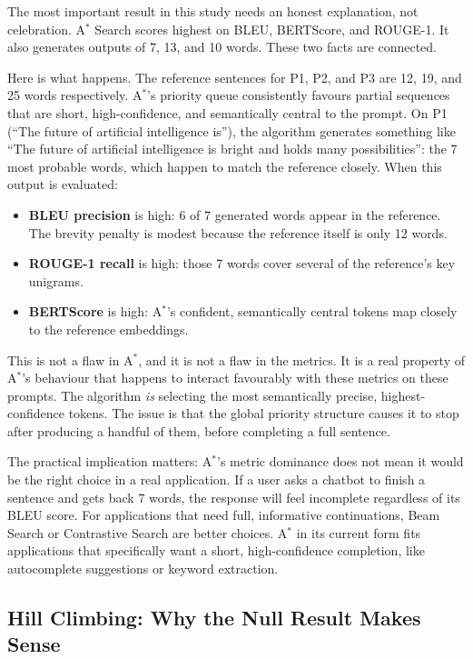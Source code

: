 \documentclass[12pt]{article}
\begin{document}
	The most important result in this study needs an honest explanation, not celebration. A$^*$ Search scores highest on BLEU, BERTScore, and ROUGE-1. It also generates outputs of 7, 13, and 10 words. These two facts are connected.
	
	Here is what happens. The reference sentences for P1, P2, and P3 are 12, 19, and 25 words respectively. A$^*$'s priority queue consistently favours partial sequences that are short, high-confidence, and semantically central to the prompt. On P1 (``The future of artificial intelligence is''), the algorithm generates something like ``The future of artificial intelligence is bright and holds many possibilities'': the 7 most probable words, which happen to match the reference closely. When this output is evaluated:
	
	\begin{itemize}[leftmargin=*]
		\item \textbf{BLEU precision} is high: 6 of 7 generated words appear in the reference. The brevity penalty is modest because the reference itself is only 12 words.
		\item \textbf{ROUGE-1 recall} is high: those 7 words cover several of the reference's key unigrams.
		\item \textbf{BERTScore} is high: A$^*$'s confident, semantically central tokens map closely to the reference embeddings.
	\end{itemize}
	
	This is not a flaw in A$^*$, and it is not a flaw in the metrics. It is a real property of A$^*$'s behaviour that happens to interact favourably with these metrics on these prompts. The algorithm \emph{is} selecting the most semantically precise, highest-confidence tokens. The issue is that the global priority structure causes it to stop after producing a handful of them, before completing a full sentence.
	
	The practical implication matters: A$^*$'s metric dominance does not mean it would be the right choice in a real application. If a user asks a chatbot to finish a sentence and gets back 7 words, the response will feel incomplete regardless of its BLEU score. For applications that need full, informative continuations, Beam Search or Contrastive Search are better choices. A$^*$ in its current form fits applications that specifically want a short, high-confidence completion, like autocomplete suggestions or keyword extraction.
	
	\subsection{Hill Climbing: Why the Null Result Makes Sense}
	\label{sec:hillclimb_discussion}
	
\end{document}
